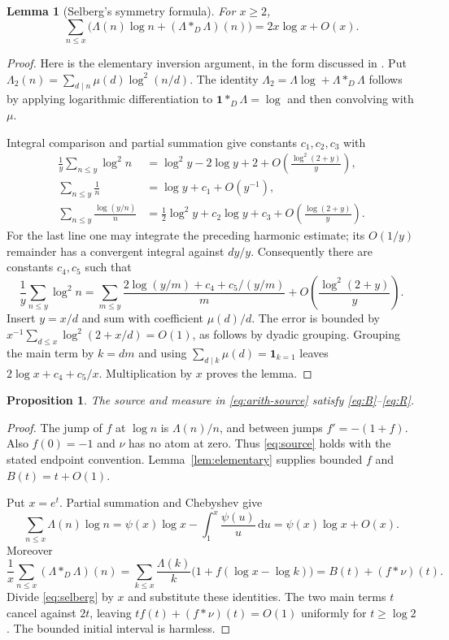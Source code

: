 \documentclass[11pt,letterpaper]{article}
\numberwithin{equation}{section}
\newtheorem{proposition}[theorem]{Proposition}
\newtheorem{lemma}[theorem]{Lemma}
\theoremstyle{definition}
\theoremstyle{remark}
\newcommand{\ind}{\mathbf 1}
\newcommand{\dd}{\,\mathrm d}
\begin{document}
\begin{lemma}[Selberg's symmetry formula]\label{lem:selberg}
For $x\ge2$,
\begin{equation}\label{eq:selberg}
 \sum_{n\le x}\bigl(\Lambda(n)\log n+(\Lambda*_D\Lambda)(n)\bigr)
 =2x\log x+O(x).
\end{equation}
\end{lemma}
\begin{proof}
Here is the elementary inversion argument, in the form discussed
in \cite[Section 1]{tao}. Put
$\Lambda_2(n)=\sum_{d\mid n}\mu(d)\log^2(n/d)$.
The identity $\Lambda_2=\Lambda\log+ \Lambda*_D\Lambda$ follows by
applying logarithmic differentiation to $\mathbf1*_D\Lambda=\log$
and then convolving with $\mu$.

Integral comparison and partial summation give constants $c_1,c_2,c_3$ with
\begin{align*}
 \frac1y\sum_{n\le y}\log^2n
   &=\log^2y-2\log y+2+O\!\left(\frac{\log^2(2+y)}y\right),\\
 \sum_{n\le y}\frac1n&=\log y+c_1+O(y^{-1}),\\
 \sum_{n\le y}\frac{\log(y/n)}n
   &=\tfrac12\log^2y+c_2\log y+c_3
       +O\!\left(\frac{\log(2+y)}y\right).
\end{align*}
For the last line one may integrate the preceding harmonic estimate;
its $O(1/y)$ remainder has a convergent integral against $dy/y$.
Consequently there are constants $c_4,c_5$ such that
\[
 \frac1y\sum_{n\le y}\log^2n
 =\sum_{m\le y}\frac{2\log(y/m)+c_4+c_5/(y/m)}m
   +O\!\left(\frac{\log^2(2+y)}y\right).
\]
Insert $y=x/d$ and sum with coefficient $\mu(d)/d$.
The error is bounded by
$x^{-1}\sum_{d\le x}\log^2(2+x/d)=O(1)$, as follows by dyadic grouping.
Grouping the main term by $k=dm$ and using
$\sum_{d\mid k}\mu(d)=\ind_{k=1}$ leaves
$2\log x+c_4+c_5/x$. Multiplication by $x$ proves the lemma.
\end{proof}

\begin{proposition}\label{prop:arithmetic-source}
The source and measure in \eqref{eq:arith-source} satisfy
\eqref{eq:B}--\eqref{eq:R}.
\end{proposition}
\begin{proof}
The jump of $f$ at $\log n$ is $\Lambda(n)/n$, and between jumps
$f'=-(1+f)$. Also $f(0)=-1$ and $\nu$ has no atom at zero. Thus
\eqref{eq:source} holds with the stated endpoint convention.
Lemma~\ref{lem:elementary} supplies bounded $f$ and $B(t)=t+O(1)$.

Put $x=e^t$. Partial summation and Chebyshev give
\[
 \sum_{n\le x}\Lambda(n)\log n
   =\psi(x)\log x-\int_1^x\frac{\psi(u)}u\dd u
   =\psi(x)\log x+O(x).
\]
Moreover
\[
 \frac1x\sum_{n\le x}(\Lambda*_D\Lambda)(n)
 =\sum_{k\le x}\frac{\Lambda(k)}k
       \bigl(1+f(\log x-\log k)\bigr)
 =B(t)+(f*\nu)(t).
\]
Divide \eqref{eq:selberg} by $x$ and substitute these identities.
The two main terms $t$ cancel against $2t$, leaving
$tf(t)+(f*\nu)(t)=O(1)$ uniformly for $t\ge\log2$.
The bounded initial interval is harmless.
\end{proof}
\end{document}
